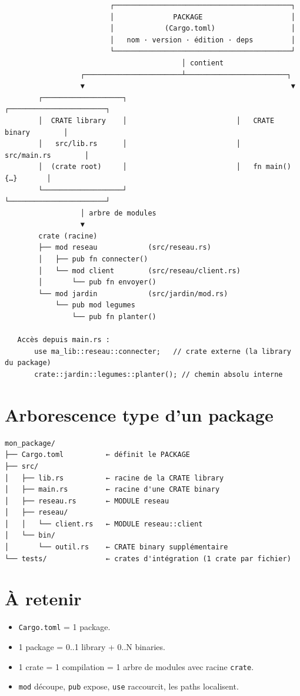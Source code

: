 \documentclass[11pt]{article}
\begin{document}
\begin{verbatim}
                         ┌──────────────────────────────────────────┐
                         │              PACKAGE                     │
                         │            (Cargo.toml)                  │
                         │   nom · version · édition · deps         │
                         └──────────────────────────────────────────┘
                                          │ contient
                  ┌───────────────────────┴────────────────────────┐
                  ▼                                                 ▼
        ┌───────────────────┐                          ┌───────────────────────┐
        │  CRATE library    │                          │   CRATE binary        │
        │   src/lib.rs      │                          │    src/main.rs        │
        │  (crate root)     │                          │   fn main() {…}       │
        └───────────────────┘                          └───────────────────────┘
                  │ arbre de modules
                  ▼
        crate (racine)
        ├── mod reseau            (src/reseau.rs)
        │   ├── pub fn connecter()
        │   └── mod client        (src/reseau/client.rs)
        │       └── pub fn envoyer()
        └── mod jardin            (src/jardin/mod.rs)
            └── pub mod legumes
                └── pub fn planter()

   Accès depuis main.rs :
       use ma_lib::reseau::connecter;   // crate externe (la library du package)
       crate::jardin::legumes::planter(); // chemin absolu interne
\end{verbatim}
\section{Arborescence type d'un package}
\label{sec:org105b0fa}

\begin{verbatim}
mon_package/
├── Cargo.toml          ← définit le PACKAGE
├── src/
│   ├── lib.rs          ← racine de la CRATE library
│   ├── main.rs         ← racine d'une CRATE binary
│   ├── reseau.rs       ← MODULE reseau
│   ├── reseau/
│   │   └── client.rs   ← MODULE reseau::client
│   └── bin/
│       └── outil.rs    ← CRATE binary supplémentaire
└── tests/              ← crates d'intégration (1 crate par fichier)
\end{verbatim}
\section{À retenir}
\label{sec:orgfdd8a76}

\begin{itemize}
\item \texttt{Cargo.toml} = 1 package.
\item 1 package = 0..1 library + 0..N binaries.
\item 1 crate = 1 compilation = 1 arbre de modules avec racine \texttt{crate}.
\item \texttt{mod} découpe, \texttt{pub} expose, \texttt{use} raccourcit, les paths localisent.
\end{itemize}
\end{document}

